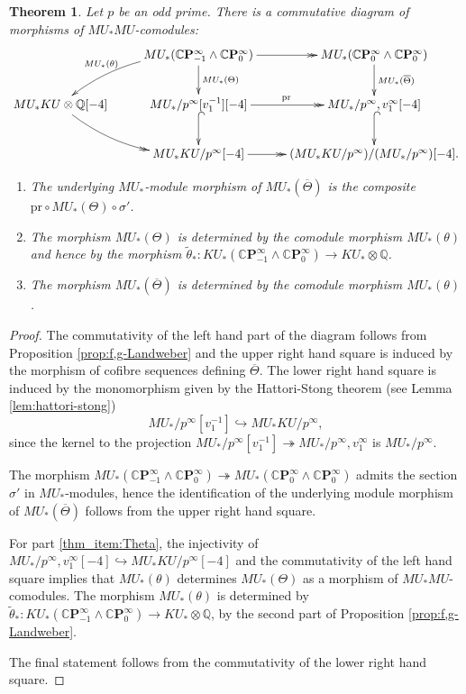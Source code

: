 \documentclass[10pt,a4paper]{amsart}
\newtheorem{thm}{Theorem}[section]
\theoremstyle{definition}
\theoremstyle{remark}
\newcommand{\rat}{\mathbb{Q}}
\newcommand{\cp}{\mathbb{C} \mathbf{P}^\infty}
\renewcommand{\smash}{\wedge}
\begin{document}
\begin{thm}
\label{thm:MU-thetas}
Let $p$ be an odd prime.
There is  a commutative diagram of morphisms of
$MU_*MU$-comodules:
\[
\xymatrix{
 &
MU_* (\cp_{-1}\smash \cp_0)
\ar@{->>}[r]
\ar@/_1pc/[ld]_(.6){MU_*(\theta)}
\ar[d]^{MU_*(\Theta)}
&
MU_* (\cp_{0}\smash \cp_0)
\ar[d]^{MU_*(\overline{\Theta})}
\\
MU_* KU \otimes \rat[-4]
\ar@{->>}@/_1pc/[rd]
&
MU_*/p^\infty[v_1^{-1}] [-4]
\ar@{^(->}[d]
\ar@{->>}[r]^{\mathrm{pr}}
&
MU_* /p^\infty,v_1^\infty [-4]
\ar@{^(->}[d]
\\
&
MU_* KU /p^\infty[-4]
\ar@{->>}[r]
&
(MU_* KU /p^\infty)/(MU_*/p^\infty)[-4].
}
\]
\begin{enumerate}
	\item
	The underlying $MU_*$-module morphism of  $MU_* (\overline{\Theta})$ is the composite $\mathrm{pr}\circ MU_* (\Theta)
\circ \sigma'$.
\item
\label{thm_item:Theta}
The morphism $MU_*({\Theta})$ is determined by the comodule
morphism $MU_* (\theta)$ and hence by the morphism $\tilde{\theta}_* : KU_* (\cp_{-1}\smash \cp_0
)\rightarrow KU_* \otimes \rat$.
\item
The morphism $MU_*(\overline{\Theta})$ is determined by the comodule
morphism $MU_* (\theta)$.
\end{enumerate}
\end{thm}

\begin{proof}
	The commutativity of the left hand part of the diagram follows from Proposition \ref{prop:f,g-Landweber} and the  upper right hand square is induced by the morphism of cofibre sequences defining $\overline{\Theta}$.  The lower right hand square is induced by the monomorphism given by the Hattori-Stong theorem (see Lemma \ref{lem:hattori-stong})
\[
	MU_* /p^\infty [v_1^{-1}] \hookrightarrow MU_ * KU /p^\infty,
\]
since the kernel to the projection $MU_* /p^\infty [v_1^{-1}] \twoheadrightarrow MU_*/p^\infty , v_1^\infty $ is
$MU_* /p^\infty$.

The morphism $MU_* (\cp_{-1} \smash \cp_0) \twoheadrightarrow MU_* (\cp_0 \smash \cp_0)$  admits the section $\sigma'$ in $MU_*$-modules, hence the identification of the underlying module morphism of $MU_* (\overline{\Theta})$ follows from the upper right hand square.




For part \ref{thm_item:Theta}, the injectivity of
$MU_* /p^\infty, v_1 ^\infty [-4] \hookrightarrow MU_* KU /p^\infty[-4]$
and the commutativity of the left hand square implies that $
MU_* (\theta)$ determines $MU_* ({\Theta})$ as a morphism of $MU_*MU$-comodules. The morphism $MU_* (\theta)$ is determined by $\tilde{\theta}_* : KU_* (\cp_{-1}\smash \cp_0
)\rightarrow KU_* \otimes \rat$, by the second part of Proposition \ref{prop:f,g-Landweber}.

The final statement follows from the commutativity of the lower right hand square.
\end{proof}
\end{document}
